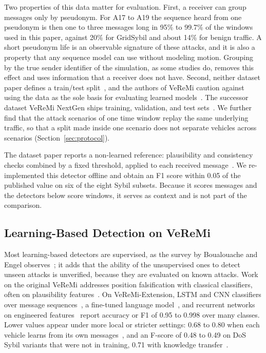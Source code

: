 Two properties of this data matter for evaluation. First, a receiver can group messages only by pseudonym. For
A17 to A19 the sequence heard from one pseudonym is then one to three messages long in 95\% to 99.7\% of the
windows used in this paper, against 20\% for GridSybil and about 14\% for benign traffic. A short pseudonym life
is an observable signature of these attacks, and it is also a property that any sequence model can use without
modeling motion. Grouping by the true sender identifier of the simulation, as some studies do, removes this effect
and uses information that a receiver does not have. Second, neither dataset paper defines a train/test
split~\cite{heijden2018veremi,kamel2020veremi}, and the authors of VeReMi caution against using the data as the
sole basis for evaluating learned models~\cite{heijden2018veremi}. The successor dataset VeReMi NextGen ships
training, validation, and test sets~\cite{hermann2026veremi}. We further find that the attack scenarios of one
time window replay the same underlying traffic, so that a split made inside one scenario does not separate
vehicles across scenarios (Section~\ref{sec:protocol}).

The dataset paper reports a non-learned reference: plausibility and consistency checks combined by a fixed
threshold, applied to each received message~\cite{kamel2020veremi}. We re-implemented this detector offline and
obtain an F1 score within 0.05 of the published value on six of the eight Sybil subsets. Because it scores messages and the
detectors below score windows, it serves as context and is not part of the comparison.

\subsection{Learning-Based Detection on VeReMi}

Most learning-based detectors are supervised, as the survey by Boualouache and Engel
observes~\cite{boualouache2023survey}; it adds that the ability of the unsupervised ones to detect unseen attacks
is unverified, because they are evaluated on known attacks. Work on the original VeReMi addresses position
falsification with classical classifiers, often on plausibility
features~\cite{so2018integrating,sharma2021machine,ercan2022misbehavior,sharma2022machine,uprety2021privacy}.
On VeReMi-Extension, LSTM and CNN classifiers over message sequences~\cite{alladi2021securing,alladi2023deep},
a fine-tuned language model~\cite{hamhoum2024mistralbsm}, and recurrent networks on engineered
features~\cite{youness2025vemisnet,mahesh2025hyperlstm} report accuracy or F1 of 0.95 to 0.998 over many classes.
Lower values appear under more local or stricter settings: 0.68 to 0.80 when each vehicle learns from its own
messages~\cite{demir2025distributed}, and an F-score of 0.48 to 0.49 on DoS Sybil variants that were not in
training, 0.71 with knowledge transfer~\cite{sedar2024knowledge}.

